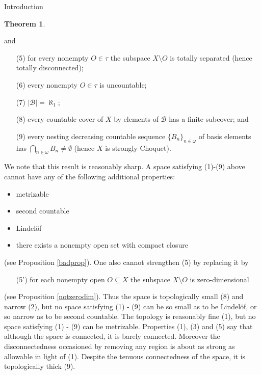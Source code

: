 \documentclass{amsart}
\theoremstyle{definition}\newtheorem{theorem}{Theorem}
\theoremstyle{definition}\newtheorem{bigtheorem}{Theorem}
\numberwithin{theorem}{section}
\theoremstyle{definition}\newtheorem{corollary}[theorem]{Corollary}
\theoremstyle{definition}\newtheorem{proposition}[theorem]{Proposition}
\theoremstyle{definition}\newtheorem{definition}[theorem]{Definition}
\theoremstyle{definition}\newtheorem{question}[theorem]{Question}
\theoremstyle{definition}\newtheorem{example}[theorem]{Example}
\theoremstyle{definition}\newtheorem{remark}[theorem]{Remark}
\theoremstyle{definition}\newtheorem{note}[theorem]{Note}
\theoremstyle{definition}\newtheorem{lemma}[theorem]{Lemma}
\theoremstyle{definition}\newtheorem{fact}[theorem]{Fact}
\theoremstyle{definition}\newtheorem{define}[theorem]{Definition}
\theoremstyle{definition}\newtheorem{definitions}[theorem]{Definitions}
\theoremstyle{definition}\newtheorem{claim}[theorem]{Claim}
\theoremstyle{definition}\newtheorem{obs}[theorem]{Observation}
\theoremstyle{definition}\newtheorem{construction}[theorem]{Construction}
\newcommand{\Bo}{\mathcal{B}}
\begin{document}
\begin{section}{Introduction}
\begin{theorem}
\begin{enumerate}
\end{enumerate}

\noindent and

\begin{enumerate}

\item[(5)] for every nonempty $O \in \tau$ the subspace $X \setminus O$ is totally separated (hence totally disconnected);

\item[(6)] every nonempty $O \in \tau$ is uncountable;

\item[(7)] $|\mathcal{B}| = \aleph_1$;

\item[(8)] every countable cover of $X$ by elements of $\Bo$ has a finite subcover; and

\item[(9)] every nesting decreasing countable sequence $\{B_n\}_{n\in \omega}$ of basis elements has $\bigcap_{n\in \omega} B_n \neq \emptyset$ (hence $X$ is strongly Choquet).

\end{enumerate}
\end{theorem}

We note that this result is reasonably sharp.  A space satisfying (1)-(9) above cannot have any of the following additional properties:

\begin{itemize}

\item metrizable

\item second countable

\item Lindel\"of

\item there exists a nonempty open set with compact closure
\end{itemize}

\noindent (see Proposition \ref{badprop}).  One also cannot strengthen (5) by replacing it by

\begin{enumerate}
\item[(5')] for each nonempty open $O \subseteq X$ the subspace $X \setminus O$ is zero-dimensional
\end{enumerate}

\noindent (see Proposition \ref{notzerodim}).  Thus the space is topologically small (8) and narrow (2), but no space satisfying (1) - (9) can be so small as to be Lindel\"of, or so narrow as to be second countable.  The topology is reasonably fine (1), but no space satisfying (1) - (9) can be metrizable.  Properties (1), (3) and (5) say that although the space is connected, it is barely connected.  Moreover the disconnectedness occasioned by removing any region is about as strong as allowable in light of (1).  Despite the tenuous connectedness of the space, it is topologically thick (9).



\end{section}
\end{document}
